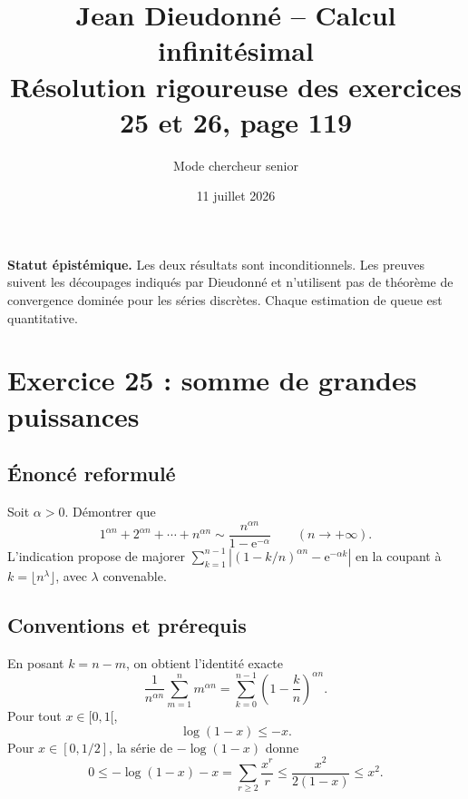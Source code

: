 \documentclass[11pt,a4paper]{article}
\title{Jean Dieudonn\'e -- Calcul infinit\'esimal\\
\large R\'esolution rigoureuse des exercices 25 et 26, page 119}
\author{Mode chercheur senior}
\date{11 juillet 2026}
\newcommand{\e}{\mathrm e}
\begin{document}
\maketitle
\tableofcontents

\begin{remarkbox}
\textbf{Statut \'epist\'emique.} Les deux r\'esultats sont inconditionnels.
Les preuves suivent les d\'ecoupages indiqu\'es par Dieudonn\'e et n'utilisent
pas de th\'eor\`eme de convergence domin\'ee pour les s\'eries discr\`etes.
Chaque estimation de queue est quantitative.
\end{remarkbox}

\section{Exercice 25 : somme de grandes puissances}

\subsection{\'Enonc\'e reformul\'e}
\begin{theorembox}
Soit $\alpha>0$. D\'emontrer que
\[
 1^{\alpha n}+2^{\alpha n}+\cdots+n^{\alpha n}
 \sim \frac{n^{\alpha n}}{1-\e^{-\alpha}}
 \qquad(n\to+\infty).
\]
L'indication propose de majorer
$\sum_{k=1}^{n-1}|(1-k/n)^{\alpha n}-\e^{-\alpha k}|$ en la coupant \`a
$k=\lfloor n^\lambda\rfloor$, avec $\lambda$ convenable.
\end{theorembox}

\subsection{Conventions et pr\'erequis}
En posant $k=n-m$, on obtient l'identit\'e exacte
\begin{equation}
 \frac1{n^{\alpha n}}\sum_{m=1}^n m^{\alpha n}
 =\sum_{k=0}^{n-1}\left(1-\frac{k}{n}\right)^{\alpha n}. \tag{1}
\end{equation}
Pour tout $x\in[0,1[$,
\begin{equation}
 \log(1-x)\leq-x. \tag{2}
\end{equation}
Pour $x\in[0,1/2]$, la s\'erie de $-\log(1-x)$ donne
\begin{equation}
 0\leq-\log(1-x)-x=\sum_{r\geq2}\frac{x^r}{r}
 \leq\frac{x^2}{2(1-x)}\leq x^2. \tag{3}
\end{equation}
\end{document}
